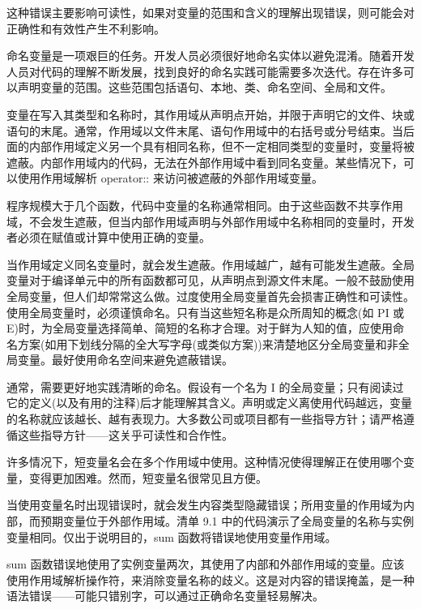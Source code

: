 
这种错误主要影响可读性，如果对变量的范围和含义的理解出现错误，则可能会对正确性和有效性产生不利影响。

命名变量是一项艰巨的任务。开发人员必须很好地命名实体以避免混淆。随着开发人员对代码的理解不断发展，找到良好的命名实践可能需要多次迭代。存在许多可以声明变量的范围。这些范围包括语句、本地、类、命名空间、全局和文件。

变量在写入其类型和名称时，其作用域从声明点开始，并限于声明它的文件、块或语句的末尾。通常，作用域以文件末尾、语句作用域中的右括号或分号结束。当后面的内部作用域定义另一个具有相同名称，但不一定相同类型的变量时，变量将被遮蔽。内部作用域内的代码，无法在外部作用域中看到同名变量。某些情况下，可以使用作用域解析 operator:: 来访问被遮蔽的外部作用域变量。

程序规模大于几个函数，代码中变量的名称通常相同。由于这些函数不共享作用域，不会发生遮蔽，但当内部作用域声明与外部作用域中名称相同的变量时，开发者必须在赋值或计算中使用正确的变量。


当作用域定义同名变量时，就会发生遮蔽。作用域越广，越有可能发生遮蔽。全局变量对于编译单元中的所有函数都可见，从声明点到源文件末尾。一般不鼓励使用全局变量，但人们却常常这么做。过度使用全局变量首先会损害正确性和可读性。使用全局变量时，必须谨慎命名。只有当这些短名称是众所周知的概念(如 PI 或 E)时，为全局变量选择简单、简短的名称才合理。对于鲜为人知的值，应使用命名方案(如用下划线分隔的全大写字母(或类似方案))来清楚地区分全局变量和非全局变量。最好使用命名空间来避免遮蔽错误。

通常，需要更好地实践清晰的命名。假设有一个名为 I 的全局变量；只有阅读过它的定义(以及有用的注释)后才能理解其含义。声明或定义离使用代码越远，变量的名称就应该越长、越有表现力。大多数公司或项目都有一些指导方针；请严格遵循这些指导方针——这关乎可读性和合作性。

许多情况下，短变量名会在多个作用域中使用。这种情况使得理解正在使用哪个变量，变得更加困难。然而，短变量名很常见且方便。

当使用变量名时出现错误时，就会发生内容类型隐藏错误；所用变量的作用域为内部，而预期变量位于外部作用域。清单 9.1 中的代码演示了全局变量的名称与实例变量相同。仅出于说明目的，sum 函数将错误地使用变量作用域。

sum 函数错误地使用了实例变量两次，其使用了内部和外部作用域的变量。应该使用作用域解析操作符，来消除变量名称的歧义。这是对内容的错误掩盖，是一种语法错误——可能只错别字，可以通过正确命名变量轻易解决。


